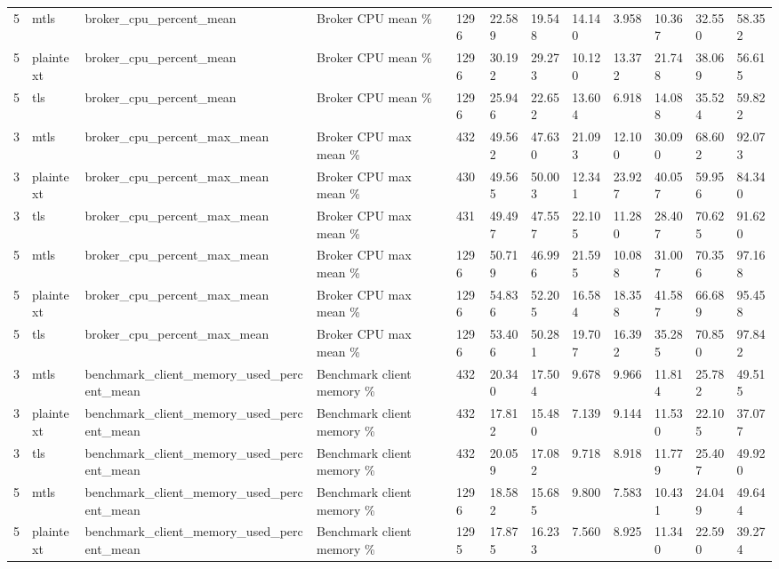 \begin{longtable}{llllllllllll}
5 & mtls & broker\_cpu\_percent\_mean & Broker CPU mean \% & 1296 & 22.589 & 19.548 & 14.140 & 3.958 & 10.367 & 32.550 & 58.352 \\
5 & plaintext & broker\_cpu\_percent\_mean & Broker CPU mean \% & 1296 & 30.192 & 29.273 & 10.120 & 13.372 & 21.748 & 38.069 & 56.615 \\
5 & tls & broker\_cpu\_percent\_mean & Broker CPU mean \% & 1296 & 25.946 & 22.652 & 13.604 & 6.918 & 14.088 & 35.524 & 59.822 \\
3 & mtls & broker\_cpu\_percent\_max\_mean & Broker CPU max mean \% & 432 & 49.562 & 47.630 & 21.093 & 12.100 & 30.090 & 68.602 & 92.073 \\
3 & plaintext & broker\_cpu\_percent\_max\_mean & Broker CPU max mean \% & 430 & 49.565 & 50.003 & 12.341 & 23.927 & 40.057 & 59.956 & 84.340 \\
3 & tls & broker\_cpu\_percent\_max\_mean & Broker CPU max mean \% & 431 & 49.497 & 47.557 & 22.105 & 11.280 & 28.407 & 70.625 & 91.620 \\
5 & mtls & broker\_cpu\_percent\_max\_mean & Broker CPU max mean \% & 1296 & 50.719 & 46.996 & 21.595 & 10.088 & 31.007 & 70.356 & 97.168 \\
5 & plaintext & broker\_cpu\_percent\_max\_mean & Broker CPU max mean \% & 1296 & 54.836 & 52.205 & 16.584 & 18.358 & 41.587 & 66.689 & 95.458 \\
5 & tls & broker\_cpu\_percent\_max\_mean & Broker CPU max mean \% & 1296 & 53.406 & 50.281 & 19.707 & 16.392 & 35.285 & 70.850 & 97.842 \\
3 & mtls & benchmark\_client\_memory\_used\_percent\_mean & Benchmark client memory \% & 432 & 20.340 & 17.504 & 9.678 & 9.966 & 11.814 & 25.782 & 49.515 \\
3 & plaintext & benchmark\_client\_memory\_used\_percent\_mean & Benchmark client memory \% & 432 & 17.812 & 15.480 & 7.139 & 9.144 & 11.530 & 22.105 & 37.077 \\
3 & tls & benchmark\_client\_memory\_used\_percent\_mean & Benchmark client memory \% & 432 & 20.059 & 17.082 & 9.718 & 8.918 & 11.779 & 25.407 & 49.920 \\
5 & mtls & benchmark\_client\_memory\_used\_percent\_mean & Benchmark client memory \% & 1296 & 18.582 & 15.685 & 9.800 & 7.583 & 10.431 & 24.049 & 49.644 \\
5 & plaintext & benchmark\_client\_memory\_used\_percent\_mean & Benchmark client memory \% & 1295 & 17.875 & 16.233 & 7.560 & 8.925 & 11.340 & 22.590 & 39.274 \\

\end{longtable}
